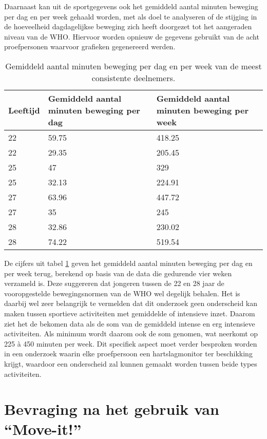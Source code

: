 Daarnaast kan uit de sportgegevens ook het gemiddeld aantal minuten beweging per dag en per week gehaald worden, met als doel te analyseren of de stijging in de hoeveelheid dagdagelijkse beweging zich heeft doorgezet tot het aangeraden niveau van de WHO. Hiervoor worden opnieuw de gegevens gebruikt van de acht proefpersonen waarvoor grafieken gegenereerd werden.

\begin{table}[h]
    \caption[Gemiddeld aantal minuten beweging per dag en per week]{Gemiddeld aantal minuten beweging per dag en per week van de meest consistente deelnemers.}
    \centering
    \label{table:gemiddeldes}
\begin{tabular}{||m{.2\linewidth} m{.4\linewidth} m{.4\linewidth}||}
    \hline
    Leeftijd & Gemiddeld aantal minuten beweging per dag & Gemiddeld aantal minuten beweging per week \\ [0.5ex]
    \hline\hline
    22 & 59.75 & 418.25 \\
    22 & 29.35 & 205.45 \\
    25 & 47 & 329 \\
    25 & 32.13 & 224.91 \\
    27 & 63.96 & 447.72 \\
    27 & 35 & 245 \\
    28 & 32.86 & 230.02 \\
    28 & 74.22 & 519.54 \\ [1ex]
    \hline
\end{tabular}
\end{table}

De cijfers uit tabel \ref{table:gemiddeldes} geven het gemiddeld aantal minuten beweging per dag en per week terug, berekend op basis van de data die gedurende vier weken verzameld is.
Deze suggereren dat jongeren tussen de 22 en 28 jaar de vooropgestelde bewegingsnormen van de WHO wel degelijk behalen.
Het is daarbij wel zeer belangrijk te vermelden dat dit onderzoek geen onderscheid kan maken tussen sportieve activiteiten met gemiddelde of intensieve inzet. Daarom ziet het de bekomen data als de som van de gemiddeld intense en erg intensieve activiteiten. Als minimum wordt daarom ook de som genomen, wat neerkomt op 225 à 450 minuten per week. Dit specifiek aspect moet verder besproken worden in een onderzoek waarin elke proefpersoon een hartslagmonitor ter beschikking krijgt, waardoor een onderscheid zal kunnen gemaakt worden tussen beide types activiteiten.

\section{Bevraging na het gebruik van ``Move-it!''}

